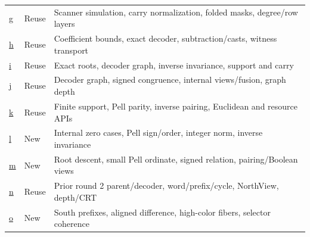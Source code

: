 {\begin{tabularx}{\linewidth}{@{}L{0.48in}L{0.48in}Y@{}}
\href{https://github.com/VladimirReshetnikov/ProveIt/tree/e652d21c413de59e4821f6e8e9b6a3a077bf5bfe/Computability/DiophantineConsistency/research/lean-proof-simplification/2026-10-26g}{g} & Reuse & Scanner simulation, carry normalization, folded masks, degree/row layers \\
\href{https://github.com/VladimirReshetnikov/ProveIt/tree/e652d21c413de59e4821f6e8e9b6a3a077bf5bfe/Computability/DiophantineConsistency/research/lean-proof-simplification/2026-10-26h}{h} & Reuse & Coefficient bounds, exact decoder, subtraction/casts, witness transport \\
\href{https://github.com/VladimirReshetnikov/ProveIt/tree/e652d21c413de59e4821f6e8e9b6a3a077bf5bfe/Computability/DiophantineConsistency/research/lean-proof-simplification/2026-10-26i}{i} & Reuse & Exact roots, decoder graph, inverse invariance, support and carry \\
\href{https://github.com/VladimirReshetnikov/ProveIt/tree/e652d21c413de59e4821f6e8e9b6a3a077bf5bfe/Computability/DiophantineConsistency/research/lean-proof-simplification/2026-10-26j}{j} & Reuse & Decoder graph, signed congruence, internal views/fusion, graph depth \\
\href{https://github.com/VladimirReshetnikov/ProveIt/tree/e652d21c413de59e4821f6e8e9b6a3a077bf5bfe/Computability/DiophantineConsistency/research/lean-proof-simplification/2026-10-26k}{k} & Reuse & Finite support, Pell parity, inverse pairing, Euclidean and resource APIs \\
\href{https://github.com/VladimirReshetnikov/ProveIt/tree/e652d21c413de59e4821f6e8e9b6a3a077bf5bfe/Computability/DiophantineConsistency/research/lean-proof-simplification/2026-10-26l}{l} & New & Internal zero cases, Pell sign/order, integer norm, inverse invariance \\
\href{https://github.com/VladimirReshetnikov/ProveIt/tree/e652d21c413de59e4821f6e8e9b6a3a077bf5bfe/Computability/DiophantineConsistency/research/lean-proof-simplification/2026-10-26m}{m} & New & Root descent, small Pell ordinate, signed relation, pairing/Boolean views \\
\href{https://github.com/VladimirReshetnikov/ProveIt/tree/e652d21c413de59e4821f6e8e9b6a3a077bf5bfe/Computability/DiophantineConsistency/research/lean-proof-simplification/2026-10-26n}{n} & Reuse & Prior round 2 parent/decoder, word/prefix/cycle, NorthView, depth/CRT \\
\href{https://github.com/VladimirReshetnikov/ProveIt/tree/e652d21c413de59e4821f6e8e9b6a3a077bf5bfe/Computability/DiophantineConsistency/research/lean-proof-simplification/2026-10-26o}{o} & New & South prefixes, aligned difference, high-color fibers, selector coherence \\

\end{tabularx}}
